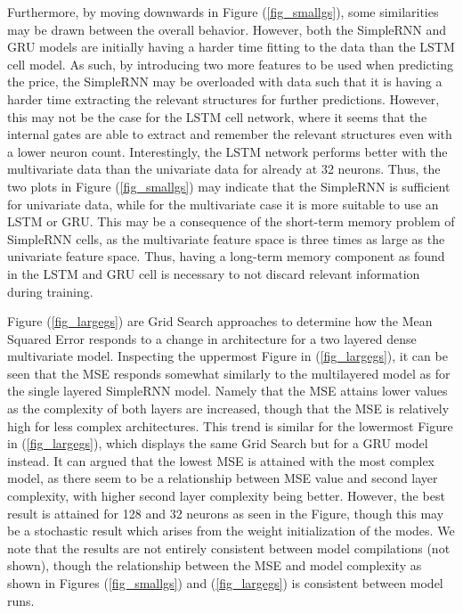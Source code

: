 \documentclass
[twocolumn,
secnumarabic,
nobibnotes,
aps,
prl,
reprint,
groupedaddress,
amsmath,
amssymb,
]{revtex4-2}
\begin{document}
Furthermore, by moving downwards in Figure (\ref{fig_smallgs}), some similarities may be drawn between the overall behavior. However, both the SimpleRNN and GRU models are initially having a harder time fitting to the data than the LSTM cell model. As such, by introducing two more features to be used when predicting the price, the SimpleRNN may be overloaded with data such that it is having a harder time extracting the relevant structures for further predictions. However, this may not be the case for the LSTM cell network, where it seems that the internal gates are able to extract and remember the relevant structures even with a lower neuron count. Interestingly, the LSTM network performs better with the multivariate data than the univariate data for already at 32 neurons. Thus, the two plots in Figure (\ref{fig_smallgs}) may indicate that the SimpleRNN is sufficient for univariate data, while for the multivariate case it is more suitable to use an LSTM or GRU. This may be a consequence of the short-term memory problem of SimpleRNN cells, as the multivariate feature space is three times as large as the univariate feature space. Thus, having a long-term memory component as found in the LSTM and GRU cell is necessary to not discard relevant information during training.

Figure (\ref{fig_largegs}) are Grid Search approaches to determine how the Mean Squared Error responds to a change in architecture for a two layered dense multivariate model. Inspecting the uppermost Figure in (\ref{fig_largegs}), it can be seen that the MSE responds somewhat similarly to the multilayered model as for the single layered SimpleRNN model. Namely that the MSE attains lower values as the complexity of both layers are increased, though that the MSE is relatively high for less complex architectures. This trend is similar for the lowermost Figure in (\ref{fig_largegs}), which displays the same Grid Search but for a GRU model instead. It can argued that the lowest MSE is attained with the most complex model, as there seem to be a relationship between MSE value and second layer complexity, with higher second layer complexity being better. However, the best result is attained for 128 and 32 neurons as seen in the Figure, though this may be a stochastic result which arises from the weight initialization of the modes. We note that the results are not entirely consistent between model compilations (not shown), though the relationship between the MSE and model complexity as shown in Figures (\ref{fig_smallgs}) and (\ref{fig_largegs}) is consistent between model runs. 
\end{document}
